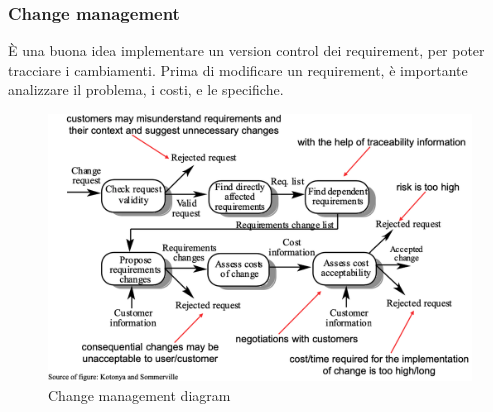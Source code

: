 \documentclass[11pt]{article}
\begin{document}
\subsubsection{Change management}
È una buona idea implementare un version control dei requirement, per poter tracciare i cambiamenti. Prima di modificare un requirement, è importante analizzare il problema, i costi, e le specifiche. 
\begin{figure}[H]
    \centering
    \includegraphics[width=\linewidth]{res/teoria/ChangeManagement.png}
    \caption{Change management diagram}
\end{figure}
\end{document}

